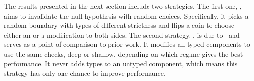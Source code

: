 The results presented in the next section include two 
 \agnostickw{} strategies. The first one, \randkw{}, aims to invalidate the null
 hypothesis with random choices. Specifically, it picks a random boundary with
 types of different strictness and flips a coin to choose either an
 \optkw{} or a \conkw{} modification to both sides.
 The second \agnostickw{} strategy, \togglekw{}, is due to~\citet{g-deep-shallow}
 and serves as a point of comparison to prior work.
 It modifies all typed components to use the same checks, deep or shallow,
 depending on which regime gives the best performance.
 It never adds types to an untyped component, which means this strategy has
 only one chance to improve performance.

